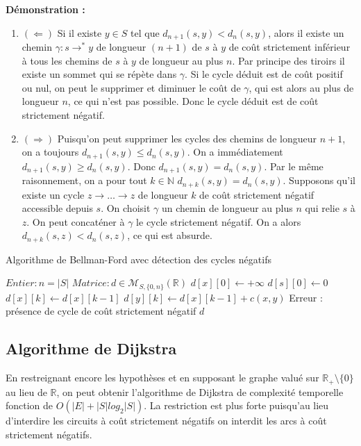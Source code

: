 \documentclass[../../../main.tex]{subfiles}
\begin{document}
\textbf{Démonstration :}
\begin{enumerate}
	\item $(\Leftarrow)$ Si il existe $y\in S$ tel que $d_{n+1}(s, y) < d_{n}(s, y)$, alors il existe un chemin $\gamma:s\rightarrow^* y$ de longueur $(n+1)$ de $s$ à $y$ de coût strictement inférieur à tous les chemins de $s$ à $y$ de longueur au plus $n$. Par principe des tiroirs il existe un sommet qui se répète dans $\gamma$. Si le cycle déduit est de coût positif ou nul, on peut le supprimer et diminuer le coût de $\gamma$, qui est alors au plus de longueur $n$, ce qui n'est pas possible. Donc le cycle déduit est de coût strictement négatif.
	\item $(\Rightarrow)$ Puisqu'on peut supprimer les cycles des chemins de longueur $n+1$, on a toujours $d_{n+1}(s, y)\leq d_{n}(s, y)$. On a immédiatement $d_{n+1}(s, y) \geq d_n(s, y)$. Donc $d_{n+1}(s, y) = d_n(s, y)$. Par le même raisonnement, on a pour tout $k\in\mathbb{N}$ $d_{n+k}(s, y) = d_n(s, y)$. Supposons qu'il existe un cycle $z\rightarrow \dots \rightarrow z$ de longueur $k$ de coût strictement négatif accessible depuis $s$. On choisit $\gamma$ un chemin de longueur au plus $n$ qui relie $s$ à $z$. On peut concaténer à $\gamma$ le cycle strictement négatif. On a alors $d_{n+k}(s, z) < d_{n}(s, z)$, ce qui est absurde.
\end{enumerate}
\begin{algorithm}
\caption{Algorithme de Bellman-Ford avec détection des cycles négatifs\label{alg:bellmanford-detect}}
$Entier:n = |S|$
$Matrice:d\in \mathcal{M}_{S, \{0, n\}}(\mathbb{R})$
 {
	$d[x][0]\leftarrow +\infty$\;
}
$d[s][0]\leftarrow 0$\;
 {
	 {
		$d[x][k] \leftarrow d[x][k-1]$\;
	}
	 {
		 {
			 {
				$d[y][k] \leftarrow d[x][k-1] + c(x, y)$
			}
		}
	}
}
 {
	 {
		\Return Erreur : présence de cycle de coût strictement négatif\;
	}
}
\Return $d$
\end{algorithm}
\subsection{Algorithme de Dijkstra}
En restreignant encore les hypothèses et en supposant le graphe valué sur $\mathbb{R}_+\setminus\{0\}$ au lieu de $\mathbb{R}$, on
peut obtenir l'algorithme de Dijkstra de complexité temporelle fonction de $O(|E| + |S|log_2|S|)$. La
restriction est plus forte puisqu'au lieu d'interdire les circuits à coût strictement négatifs on interdit
les arcs à coût strictement négatifs.
\end{document}
